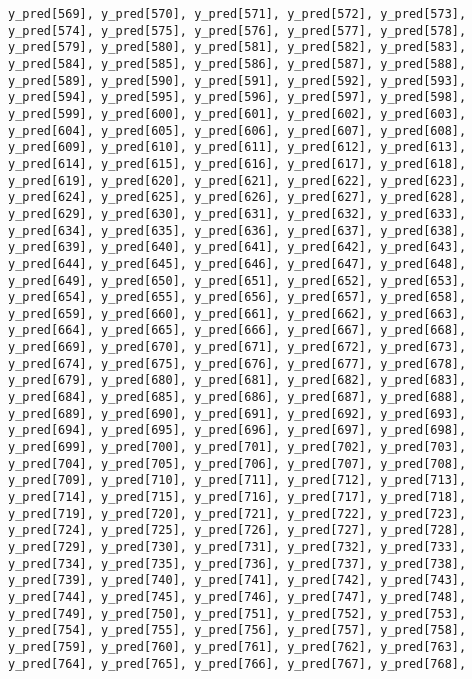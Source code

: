 \documentclass[
  letterpaper,
  DIV=11,
  numbers=noendperiod]{scrartcl}
\begin{document}
\begin{verbatim}
y_pred[569], y_pred[570], y_pred[571], y_pred[572], y_pred[573],
y_pred[574], y_pred[575], y_pred[576], y_pred[577], y_pred[578],
y_pred[579], y_pred[580], y_pred[581], y_pred[582], y_pred[583],
y_pred[584], y_pred[585], y_pred[586], y_pred[587], y_pred[588],
y_pred[589], y_pred[590], y_pred[591], y_pred[592], y_pred[593],
y_pred[594], y_pred[595], y_pred[596], y_pred[597], y_pred[598],
y_pred[599], y_pred[600], y_pred[601], y_pred[602], y_pred[603],
y_pred[604], y_pred[605], y_pred[606], y_pred[607], y_pred[608],
y_pred[609], y_pred[610], y_pred[611], y_pred[612], y_pred[613],
y_pred[614], y_pred[615], y_pred[616], y_pred[617], y_pred[618],
y_pred[619], y_pred[620], y_pred[621], y_pred[622], y_pred[623],
y_pred[624], y_pred[625], y_pred[626], y_pred[627], y_pred[628],
y_pred[629], y_pred[630], y_pred[631], y_pred[632], y_pred[633],
y_pred[634], y_pred[635], y_pred[636], y_pred[637], y_pred[638],
y_pred[639], y_pred[640], y_pred[641], y_pred[642], y_pred[643],
y_pred[644], y_pred[645], y_pred[646], y_pred[647], y_pred[648],
y_pred[649], y_pred[650], y_pred[651], y_pred[652], y_pred[653],
y_pred[654], y_pred[655], y_pred[656], y_pred[657], y_pred[658],
y_pred[659], y_pred[660], y_pred[661], y_pred[662], y_pred[663],
y_pred[664], y_pred[665], y_pred[666], y_pred[667], y_pred[668],
y_pred[669], y_pred[670], y_pred[671], y_pred[672], y_pred[673],
y_pred[674], y_pred[675], y_pred[676], y_pred[677], y_pred[678],
y_pred[679], y_pred[680], y_pred[681], y_pred[682], y_pred[683],
y_pred[684], y_pred[685], y_pred[686], y_pred[687], y_pred[688],
y_pred[689], y_pred[690], y_pred[691], y_pred[692], y_pred[693],
y_pred[694], y_pred[695], y_pred[696], y_pred[697], y_pred[698],
y_pred[699], y_pred[700], y_pred[701], y_pred[702], y_pred[703],
y_pred[704], y_pred[705], y_pred[706], y_pred[707], y_pred[708],
y_pred[709], y_pred[710], y_pred[711], y_pred[712], y_pred[713],
y_pred[714], y_pred[715], y_pred[716], y_pred[717], y_pred[718],
y_pred[719], y_pred[720], y_pred[721], y_pred[722], y_pred[723],
y_pred[724], y_pred[725], y_pred[726], y_pred[727], y_pred[728],
y_pred[729], y_pred[730], y_pred[731], y_pred[732], y_pred[733],
y_pred[734], y_pred[735], y_pred[736], y_pred[737], y_pred[738],
y_pred[739], y_pred[740], y_pred[741], y_pred[742], y_pred[743],
y_pred[744], y_pred[745], y_pred[746], y_pred[747], y_pred[748],
y_pred[749], y_pred[750], y_pred[751], y_pred[752], y_pred[753],
y_pred[754], y_pred[755], y_pred[756], y_pred[757], y_pred[758],
y_pred[759], y_pred[760], y_pred[761], y_pred[762], y_pred[763],
y_pred[764], y_pred[765], y_pred[766], y_pred[767], y_pred[768],

\end{verbatim}
\end{document}
